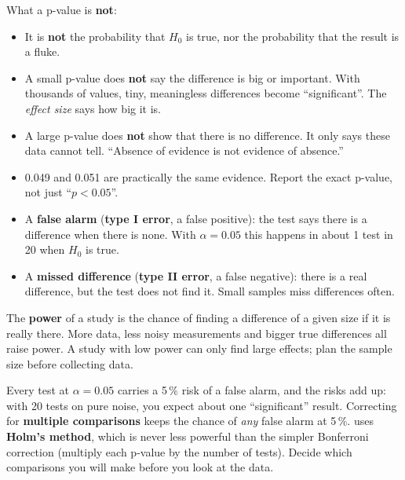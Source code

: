 \begin{goodtoknow}
What a p-value is \textbf{not}:
\begin{itemize}
  \item It is \textbf{not} the probability that $H_0$ is true, nor the probability that the result
    is a fluke.
  \item A small p-value does \textbf{not} say the difference is big or important. With thousands
    of values, tiny, meaningless differences become ``significant''. The \emph{effect size} says
    how big it is.
  \item A large p-value does \textbf{not} show that there is no difference. It only says these
    data cannot tell. ``Absence of evidence is not evidence of absence.''
  \item 0.049 and 0.051 are practically the same evidence. Report the exact p-value, not just
    ``$p < 0.05$''.
\end{itemize}
\end{goodtoknow}


\begin{itemize}
  \item A \textbf{false alarm} (\textbf{type I error}, a false positive): the test says there is a
    difference when there is none. With $\alpha = 0.05$ this happens in about 1 test in 20 when
    $H_0$ is true.
  \item A \textbf{missed difference} (\textbf{type II error}, a false negative): there is a real
    difference, but the test does not find it. Small samples miss differences often.
\end{itemize}

The \textbf{power} of a study is the chance of finding a difference of a given size if it is
really there. More data, less noisy measurements and bigger true differences all raise power. A
study with low power can only find large effects; plan the sample size before collecting data.


Every test at $\alpha = 0.05$ carries a 5\,\% risk of a false alarm, and the risks add up: with 20
tests on pure noise, you expect about one ``significant'' result. Correcting for
\textbf{multiple comparisons} keeps the chance of \emph{any} false alarm at 5\,\%.
 uses \textbf{Holm's method}, which is never less powerful than the
simpler Bonferroni correction (multiply each p-value by the number of tests). Decide which
comparisons you will make before you look at the data.

